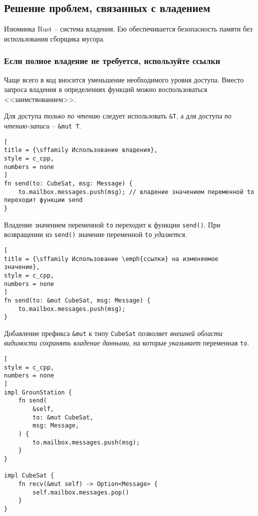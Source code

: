 \documentclass[%
	11pt,
	a4paper,
	utf8,
		]{article}
\begin{document}
\subsection{Решение проблем, связанных с владением}

Изюминка Rust -- система владения. Ею обеспечивается безопасность памяти без использования сборщика мусора.

\subsubsection{Если полное владение не требуется, используйте ссылки}

Чаще всего в код вносится уменьшение необходимого уровня доступа. Вместо запроса владения в определениях функций можно воспользоваться <<заимствованием>>.

Для доступа \emph{только по чтению} следует использовать \verb|&T|, а для доступа \emph{по чтению-записи} -- \verb|&mut T|.

\begin{lstlisting}[
title = {\sffamily Использование владения},
style = c_cpp,
numbers = none
]
fn send(to: CubeSat, msg: Message) {
    to.mailbox.messages.push(msg); // владение значением переменной to переходит функции send
}
\end{lstlisting}

Владение значением переменной \texttt{to} переходит к функции \texttt{send()}. При возвращении из \texttt{send()} значение переменной \texttt{to} \emph{удаляется}.

\begin{lstlisting}[
title = {\sffamily Использование \emph{ссылки} на изменяемое значение},
style = c_cpp,
numbers = none
]
fn send(to: &mut CubeSat, msg: Message) {
    to.mailbox.messages.push(msg);
}
\end{lstlisting}

Добавление префикса \verb|&mut| к типу \texttt{CubeSat} позволяет \emph{внешней области видимости сохранять владение данными}, на которые \emph{указывает} переменная \texttt{to}.

\begin{lstlisting}[
style = c_cpp,
numbers = none
]
impl GrounStation {
    fn send(
        &self,
        to: &mut CubeSat,
        msg: Message,
    ) {
        to.mailbox.messages.push(msg);
    }
}

impl CubeSat {
    fn recv(&mut self) -> Option<Message> {
        self.mailbox.messages.pop()
    }
}
\end{lstlisting}
\end{document}

